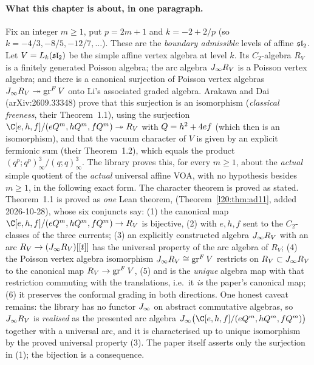 \paragraph{What this chapter is about, in one paragraph.} Fix an integer $m\ge1$, put $p=2m+1$ and
$k=-2+2/p$ (so $k=-4/3,-8/5,-12/7,\dots$). These are the \emph{boundary admissible} levels of affine
$\mathfrak{sl}_2$. Let $V=L_k(\mathfrak{sl}_2)$ be the simple affine vertex algebra at level $k$. Its $C_2$-algebra
$R_V$ is a finitely generated Poisson algebra; the arc algebra $J_\infty R_V$ is a Poisson vertex algebra;
and there is a canonical surjection of Poisson vertex algebras $J_\infty R_V\twoheadrightarrow\operatorname{gr}^F V$
onto Li's associated graded algebra. Arakawa and Dai (arXiv:2609.33348) prove that this surjection is an
isomorphism (\emph{classical freeness}, their Theorem~1.1), using the surjection
$\C[e,h,f]/(e\ltwentyQ^m,h\ltwentyQ^m,f\ltwentyQ^m)\twoheadrightarrow R_V$ with $Q=h^2+4ef$ (which then is an
isomorphism), and that the vacuum
character of $V$ is given by an explicit fermionic sum (their Theorem~1.2), which equals the product
$(q^p;q^p)_\infty^3/(q;q)_\infty^3$. The library proves this, for every $m\ge1$, about the
\emph{actual} simple quotient of the \emph{actual} universal affine VOA, with no hypothesis besides $m\ge1$, in the
following exact form. The character theorem is proved as stated. Theorem~1.1 is proved as \emph{one} Lean theorem,
 (Theorem~\ref{l20:thm:ad11}, added 2026-10-28), whose six conjuncts say: (1) the
canonical map $\C[e,h,f]/(e\ltwentyQ^m,h\ltwentyQ^m,f\ltwentyQ^m)\to R_V$ is bijective, (2) with $e,h,f$ sent to the
$C_2$-classes of the three currents; (3) an explicitly constructed algebra $J_\infty R_V$ with an arc
$R_V\to(J_\infty R_V)[[t]]$ has the universal property of the arc algebra of $R_V$; (4) the Poisson vertex algebra
isomorphism $J_\infty R_V\cong\operatorname{gr}^F V$ restricts on $R_V\subset J_\infty R_V$ to the canonical map
$R_V\to\operatorname{gr}^F V$, (5) and is the \emph{unique} algebra map with that restriction commuting with the translations, i.e.\ it
\emph{is} the paper's canonical map; (6) it preserves the conformal grading in both directions. One honest caveat
remains: the library has no functor $J_\infty$ on abstract commutative algebras, so $J_\infty R_V$ is \emph{realised}
as the presented arc algebra $\ltwentyJ\bigl(\C[e,h,f]/(e\ltwentyQ^m,h\ltwentyQ^m,f\ltwentyQ^m)\bigr)$ together with a
universal arc, and it is characterised up to unique isomorphism by the proved universal property (3). The paper itself
asserts only the surjection in (1); the bijection is a consequence.

